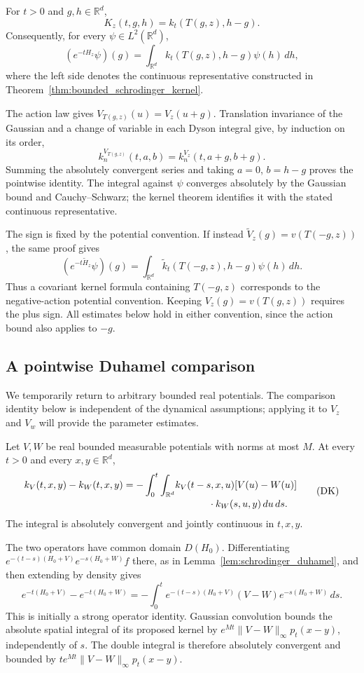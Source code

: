 \begin{proposition}
\label{prop:dynamic_covariance}
For $t>0$ and $g,h\in\mathbb R^d$,
\[
K_z(t,g,h)=k_t(T(g,z),h-g).
\tag{C}\label{eq:dynamic_covariance}
\]
Consequently, for every $\psi\in L^2(\mathbb R^d)$,
\[
(e^{-tH_z}\psi)(g)
 =\int_{\mathbb R^d}k_t(T(g,z),h-g)\psi(h)\,dh,
\]
where the left side denotes the continuous representative constructed
in Theorem~\ref{thm:bounded_schrodinger_kernel}.
\end{proposition}
\Proof
The action law gives $V_{T(g,z)}(u)=V_z(u+g)$. Translation invariance
of the Gaussian and a change of variable in each Dyson integral give,
by induction on its order,
\[
k_n^{V_{T(g,z)}}(t,a,b)=k_n^{V_z}(t,a+g,b+g).
\]
Summing the absolutely convergent series and taking $a=0$, $b=h-g$
proves the pointwise identity. The integral against $\psi$ converges
absolutely by the Gaussian bound and Cauchy--Schwarz; the kernel theorem
identifies it with the stated continuous representative.
\Done

The sign is fixed by the potential convention. If instead
$\widetilde V_z(g)=v(T(-g,z))$, the same proof gives
\[
(e^{-t\widetilde H_z}\psi)(g)
 =\int_{\mathbb R^d}\widetilde k_t(T(-g,z),h-g)\psi(h)\,dh.
\]
Thus a covariant kernel formula containing $T(-g,z)$ corresponds to
the negative-action potential convention. Keeping $V_z(g)=v(T(g,z))$ requires the plus sign.
All estimates below hold in either convention, since the action bound
also applies to $-g$.

\subsection{A pointwise Duhamel comparison}
We temporarily return to arbitrary bounded real potentials. The
comparison identity below is independent of the dynamical assumptions;
applying it to $V_z$ and $V_w$ will provide the parameter estimates.
\begin{lemma}
\label{lem:kernel_duhamel_comparison}
Let $V,W$ be real bounded measurable potentials with norms at most $M$.
At every $t>0$ and every $x,y\in\mathbb R^d$,
\[
\begin{split}
k_V(t,x,y)-k_W(t,x,y)
=-\int_0^t\int_{\mathbb R^d}
 &k_V(t-s,x,u)[V(u)-W(u)]\\[-2pt]
 &\hspace{12mm}\cdot k_W(s,u,y)\,du\,ds.
\end{split}
\tag{DK}\label{eq:kernel_duhamel_comparison}
\]
The integral is absolutely convergent and jointly continuous in $t,x,y$.
\end{lemma}
\Proof
The two operators have common domain $D(H_0)$. Differentiating
$e^{-(t-s)(H_0+V)}e^{-s(H_0+W)}f$ there, as in
Lemma~\ref{lem:schrodinger_duhamel}, and then extending by density gives
\[
e^{-t(H_0+V)}-e^{-t(H_0+W)}
=-\int_0^t e^{-(t-s)(H_0+V)}(V-W)e^{-s(H_0+W)}\,ds.
\]
This is initially a strong operator identity. Gaussian convolution
bounds the absolute spatial integral of its proposed kernel by
$e^{Mt}\|V-W\|_\infty p_t(x-y)$, independently of $s$.
The double integral is therefore absolutely convergent and bounded by
$t e^{Mt}\|V-W\|_\infty p_t(x-y)$.

